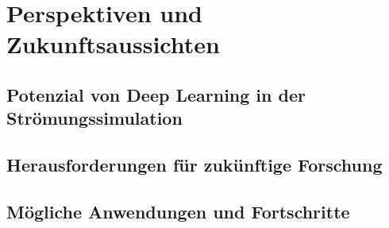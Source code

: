 \section{Perspektiven und Zukunftsaussichten}
\subsection{Potenzial von Deep Learning in der Strömungssimulation}

\subsection{Herausforderungen für zukünftige Forschung}

\subsection{Mögliche Anwendungen und Fortschritte}